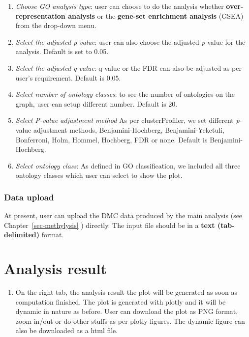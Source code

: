 \documentclass[
  a4paper,
  oneside,
  open=any]{scrreport}
\providecommand{\tightlist}{%
  \setlength{\itemsep}{0pt}\setlength{\parskip}{0pt}}\usepackage{longtable,booktabs,array}
\begin{document}
\begin{enumerate}
\def\labelenumi{\arabic{enumi}.}
\tightlist
\item
  \emph{Choose GO analysis type}: user can choose to do the analysis
  whether \textbf{over-representation analysis} or the \textbf{gene-set
  enrichment analysis} (GSEA) from the drop-down menu.
\item
  \emph{Select the adjusted p-value}: user can also choose the adjusted
  \emph{p}-value for the analysis. Default is set to 0.05.
\item
  \emph{Select the adjusted q-value}: q-value or the FDR can also be
  adjusted as per user's requirement. Default is 0.05.
\item
  \emph{Select number of ontology classes}: to see the number of
  ontologies on the graph, user can setup different number. Default is
  20.
\item
  \emph{Select P-value adjustment method} As per clusterProfiler, we set
  different \emph{p}-value adjustment methods, Benjamini-Hochberg,
  Benjamini-Yeketuli, Bonferroni, Holm, Hommel, Hochberg, FDR or none.
  Default is Benjamini-Hochberg.
\item
  \emph{Select ontology class}: As defined in GO classification, we
  included all three ontology classes which user can select to show the
  plot.
\end{enumerate}

\hypertarget{data-upload-4}{%
\subsubsection{Data upload}\label{data-upload-4}}

At present, user can upload the DMC data produced by the main analysis
(see Chapter~\ref{sec-methylysis} ) directly. The input file should be
in a \textbf{text (tab-delimited)} format.

\hypertarget{analysis-result-4}{%
\section{Analysis result}\label{analysis-result-4}}

\begin{enumerate}
\def\labelenumi{\arabic{enumi}.}
\tightlist
\item
  On the right tab, the analysis result the plot will be generated as
  soon as computation finished. The plot is generated with plotly and it
  will be dynamic in nature as before. User can download the plot as PNG
  format, zoom in/out or do other stuffs as per plotly figures. The
  dynamic figure can also be downloaded as a html file.
\end{enumerate}
\end{document}

